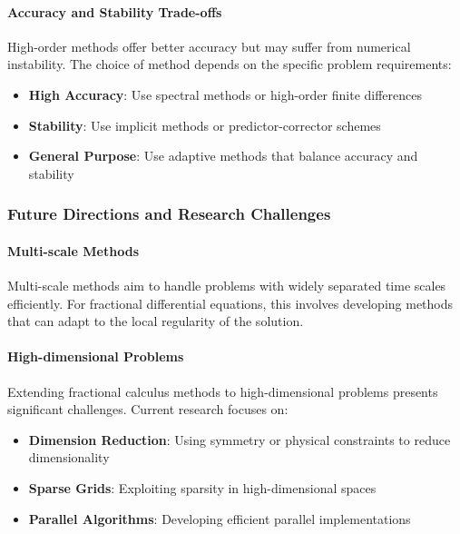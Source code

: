 \paragraph{Accuracy and Stability Trade-offs}

High-order methods offer better accuracy but may suffer from numerical instability. The choice of method depends on the specific problem requirements:

\begin{itemize}
    \item \textbf{High Accuracy}: Use spectral methods or high-order finite differences
    \item \textbf{Stability}: Use implicit methods or predictor-corrector schemes
    \item \textbf{General Purpose}: Use adaptive methods that balance accuracy and stability
\end{itemize}

\subsubsection{Future Directions and Research Challenges}

\paragraph{Multi-scale Methods}

Multi-scale methods aim to handle problems with widely separated time scales efficiently. For fractional differential equations, this involves developing methods that can adapt to the local regularity of the solution.

\paragraph{High-dimensional Problems}

Extending fractional calculus methods to high-dimensional problems presents significant challenges. Current research focuses on:

\begin{itemize}
    \item \textbf{Dimension Reduction}: Using symmetry or physical constraints to reduce dimensionality
    \item \textbf{Sparse Grids}: Exploiting sparsity in high-dimensional spaces
    \item \textbf{Parallel Algorithms}: Developing efficient parallel implementations
\end{itemize}

